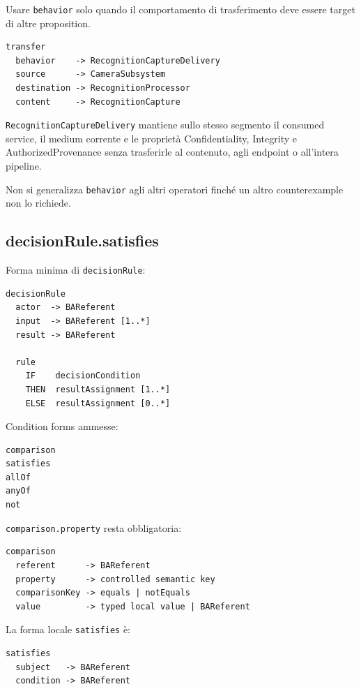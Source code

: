 \documentclass[11pt,a4paper]{article}
\newcommand{\code}[1]{\nolinkurl{#1}}
\begin{document}
Usare \code{behavior} solo quando il comportamento di trasferimento deve essere target di altre proposition.

\begin{examplebox}
\begin{lstlisting}
transfer
  behavior    -> RecognitionCaptureDelivery
  source      -> CameraSubsystem
  destination -> RecognitionProcessor
  content     -> RecognitionCapture
\end{lstlisting}

\code{RecognitionCaptureDelivery} mantiene sullo stesso segmento il consumed service, il medium corrente e le proprietà Confidentiality, Integrity e AuthorizedProvenance senza trasferirle al contenuto, agli endpoint o all'intera pipeline.
\end{examplebox}

Non si generalizza \code{behavior} agli altri operatori finché un altro counterexample non lo richiede.

\subsection{decisionRule.satisfies}

Forma minima di \code{decisionRule}:

\begin{lstlisting}
decisionRule
  actor  -> BAReferent
  input  -> BAReferent [1..*]
  result -> BAReferent

  rule
    IF    decisionCondition
    THEN  resultAssignment [1..*]
    ELSE  resultAssignment [0..*]
\end{lstlisting}

Condition forms ammesse:

\begin{lstlisting}
comparison
satisfies
allOf
anyOf
not
\end{lstlisting}

\code{comparison.property} resta obbligatoria:

\begin{lstlisting}
comparison
  referent      -> BAReferent
  property      -> controlled semantic key
  comparisonKey -> equals | notEquals
  value         -> typed local value | BAReferent
\end{lstlisting}

La forma locale \code{satisfies} è:

\begin{lstlisting}
satisfies
  subject   -> BAReferent
  condition -> BAReferent
\end{lstlisting}
\end{document}
